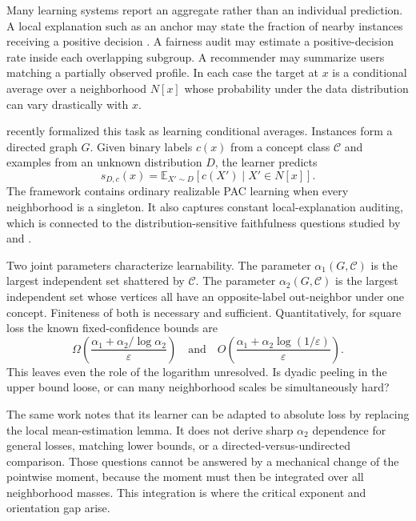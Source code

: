 \documentclass{article}
\theoremstyle{definition}
\theoremstyle{remark}
\newcommand{\E}{\mathbb E}
\newcommand{\cclass}{\mathcal C}
\begin{document}
Many learning systems report an aggregate rather than an individual prediction. A local explanation such as an anchor may state the fraction of nearby instances receiving a positive decision \citep{ribeiro2018anchors}. A fairness audit may estimate a positive-decision rate inside each overlapping subgroup. A recommender may summarize users matching a partially observed profile. In each case the target at $x$ is a conditional average over a neighborhood $N[x]$ whose probability under the data distribution can vary drastically with $x$.

\citet{bressan2026conditional} recently formalized this task as learning conditional averages. Instances form a directed graph $G$. Given binary labels $c(x)$ from a concept class $\cclass$ and examples from an unknown distribution $D$, the learner predicts
\begin{equation}
s_{D,c}(x)=\E_{X'\sim D}[c(X')\mid X'\in N[x]]. \label{eq:target}
\end{equation}
The framework contains ordinary realizable PAC learning when every neighborhood is a singleton. It also captures constant local-explanation auditing, which is connected to the distribution-sensitive faithfulness questions studied by \citet{dasgupta2022faithfulness} and \citet{bhattacharjee2024auditing}.

Two joint parameters characterize learnability. The parameter $\alpha_1(G,\cclass)$ is the largest independent set shattered by $\cclass$. The parameter $\alpha_2(G,\cclass)$ is the largest independent set whose vertices all have an opposite-label out-neighbor under one concept. Finiteness of both is necessary and sufficient. Quantitatively, for square loss the known fixed-confidence bounds are
\begin{equation}
\Omega\!\left(\frac{\alpha_1+\alpha_2/\log\alpha_2}{\varepsilon}\right)
\quad\text{and}\quad
O\!\left(\frac{\alpha_1+\alpha_2\log(1/\varepsilon)}{\varepsilon}\right). \label{eq:oldgap}
\end{equation}
This leaves even the role of the logarithm unresolved. Is dyadic peeling in the upper bound loose, or can many neighborhood scales be simultaneously hard?

The same work notes that its learner can be adapted to absolute loss by replacing the local mean-estimation lemma. It does not derive sharp $\alpha_2$ dependence for general losses, matching lower bounds, or a directed-versus-undirected comparison. Those questions cannot be answered by a mechanical change of the pointwise moment, because the moment must then be integrated over all neighborhood masses. This integration is where the critical exponent and orientation gap arise.
\end{document}
